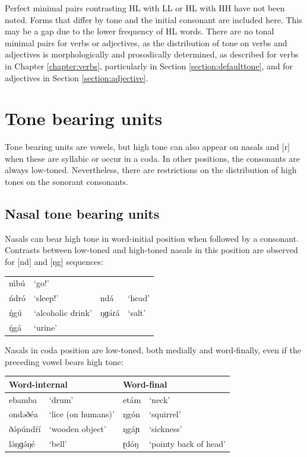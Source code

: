 Perfect minimal pairs contrasting HL with LL or HL with HH have not been noted. Forms that differ by tone and the initial consonant are included here. This may be a gap due to the lower frequency of HL words.  There are no tonal minimal pairs for verbs or adjectives, as the distribution of tone on verbs and adjectives is morphologically and prosodically determined, as described for verbs in Chapter \ref{chapter:verbs}, particularly in Section \ref{section:defaulttone}, and for adjectives in Section \ref{section:adjective}.

\section{Tone bearing units}
Tone bearing units are vowels, but high tone can also appear on nasals and [r] when these are syllabic or occur in a coda. In other positions, the consonants are always low-toned. Nevertheless, there are restrictions on the distribution of high tones on the sonorant consonants. 

\subsection{Nasal tone bearing units}	 	
Nasals can bear high tone in word-initial position when followed by a consonant. Contrasts between low-toned and high-toned nasals in this position are observed for [nd] and [ŋg] sequences:
	
\ea	 	
\begin{tabular}[t]{llll}
 ḿbú	&‘go!’  & {}& {}  \\
ńdró	&‘sleep!’	&		ndá	&‘head’  \\
 ŋ́gú	&{‘alcoholic drink’}	&ŋɡáɾá	&‘salt’\\
ŋ́gá	&‘urine’ & {} & {} \\
\end{tabular}
	\z

Nasals in coda position are low-toned, both medially and word-finally, even if the preceding vowel bears high tone:

\ea 	\begin{tabular}[t]{llll}
  \multicolumn{2}{l}{Word-internal} &   \multicolumn{2}{l}{Word-final} \\
\midrule
ebamba		&	‘drum’			&	etám	&	‘neck’ \\
ondəðéa		&‘lice (on humans)’	&ŋgón		&	‘squirrel’ \\
ðə́púndŕí	&‘wooden object’	&	ŋgáɲ	& ‘sickness’ \\
lə́ŋɡə́ŋé		&‘bell’				&	ɽdóŋ	&‘pointy back of head’ \\
			 	\end{tabular} \z

